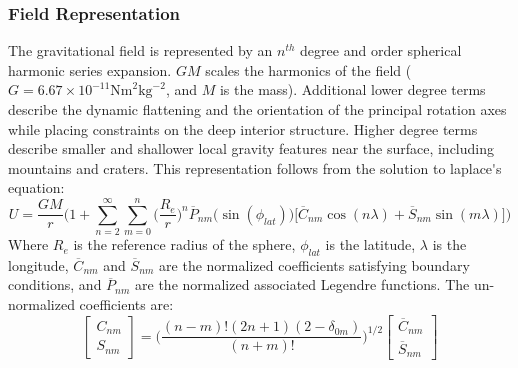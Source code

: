 \documentclass{article}
\begin{document}
                \subsubsection{\footnotesize Field Representation}
                    The \gls{gravitational field} is represented by
                    an $n^{th}$ degree and order
                    \gls{spherical harmonic} series expansion.
                    $GM$ scales the harmonics of the field
                    ($G=6.67\times{10^{-11}}%
                        \textrm{Nm}^2\textrm{kg}^{-2}$,
                    and $M$ is the mass).
                    Additional lower degree terms describe
                    the dynamic flattening
                    and the orientation of the
                    \gls{principal rotation axes} while placing
                    constraints on the deep interior structure.
                    Higher degree terms describe smaller and
                    shallower local gravity features near the
                    surface, including mountains and craters.
                    This representation follows from the solution
                    to \gls{laplace's equation}:
                    \begin{equation}
                        U=\frac{GM}{r}
                            \bigg(
                                1+\sum_{n=2}^{\infty}\sum_{m=0}^{n}
                                \bigg(\frac{R_{e}}{r}\bigg)^{n}
                                \overline{P}_{nm}
                                \big(\sin(\phi_{lat})\big)
                                \big[
                                    \overline{C}_{nm}\cos(n\lambda)+
                                    \overline{S}_{nm}\sin(m\lambda)
                                \big]
                            \bigg)
                    \end{equation}
                    Where $R_{e}$ is the reference radius of the
                    sphere, $\phi_{lat}$ is the latitude, $\lambda$
                    is the longitude, $\overline{C}_{nm}$
                    and $\overline{S}_{nm}$ are the normalized
                    coefficients satisfying boundary conditions,
                    and $\overline{P}_{nm}$ are the normalized
                    associated Legendre functions. The un-normalized
                    coefficients are:
                    \begin{equation}
                        \begin{bmatrix}
                            C_{nm}\\
                            S_{nm}
                        \end{bmatrix}
                        =\bigg(
                            \frac{(n-m)!(2n+1)(2-\delta_{0m})}
                                  {(n+m)!}
                        \bigg)^{1/2}
                        \begin{bmatrix}
                            \overline{C}_{nm}\\
                            \overline{S}_{nm}
                        \end{bmatrix}
                    \end{equation}
\end{document}
